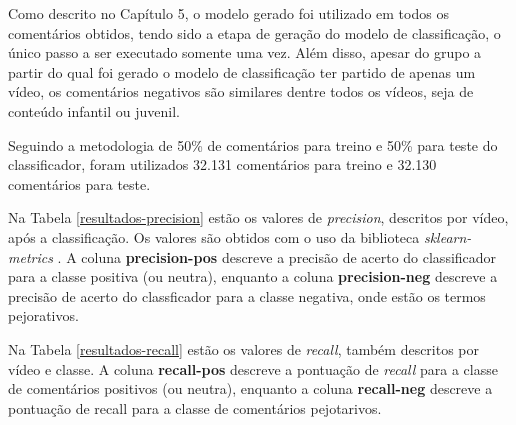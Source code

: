 Como descrito no Capítulo 5, o modelo gerado foi utilizado em todos os comentários obtidos, tendo sido a etapa de geração do modelo de classificação, o único passo a ser executado somente uma vez. Além disso, apesar do grupo a partir do qual foi gerado o modelo de classificação ter partido de apenas um vídeo, os comentários negativos são similares dentre todos os vídeos, seja de conteúdo infantil ou juvenil.
\begin{comment}
\textcolor{red}{Não entendi Isaias, como você calculou recall e precision dos comentários dos outros projetos, se você não os avaliou com a SentiStregth... ou avaliou? Isso não fica claro e gera algumas dúvidas. Além disso, é bom dizer que mesmo que você tenha usado somente de um tipo de video, os comentários para criar o modelo e o testar, você tem comentários similares nos outros vídeos...}
\textcolor{pink}{I: Todos foram avaliados com Sentistrength, vou deixar mais explicito aqui e também na metodologia. Sobre os comentários similares, irei mencionar.}
\end{comment}
Seguindo a metodologia de 50\% de comentários para treino e 50\% para teste do classificador, foram utilizados 32.131 comentários para treino e 32.130 comentários para teste. 

Na Tabela \ref{resultados-precision} estão os valores de \textit{precision}, descritos por vídeo, após a classificação. Os valores são obtidos com o uso da biblioteca \textit{sklearn-metrics} \cite{scikit-learn}. A coluna \textbf{precision-pos} descreve a precisão de acerto do classificador para a classe positiva (ou neutra), enquanto a coluna \textbf{precision-neg} descreve a precisão de acerto do classficador para a classe negativa, onde estão os termos pejorativos.

Na Tabela \ref{resultados-recall} estão os valores de \textit{recall}, também descritos por vídeo e classe. A coluna \textbf{recall-pos} descreve a pontuação de \textit{recall} para a classe de comentários positivos (ou neutra), enquanto a coluna \textbf{recall-neg} descreve a pontuação de recall para a classe de comentários pejotarivos.





